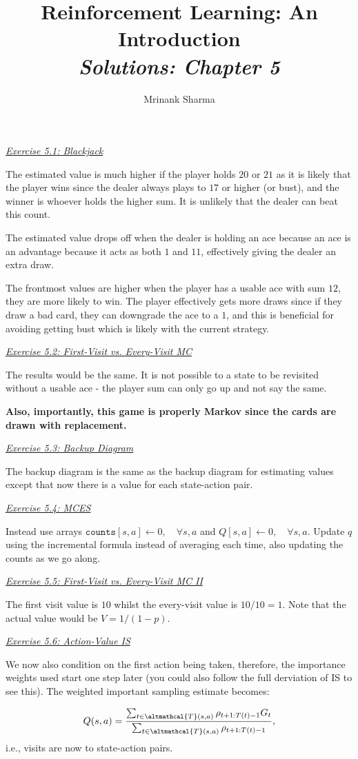 \documentclass{article}
\title{\textbf{Reinforcement Learning: An Introduction}\\
\textit{Solutions: Chapter 5}
}
\author{Mrinank Sharma}
\newcommand{\myq}[1]{%
	\vspace{1em}
	\noindent\underline{\emph{Exercise #1}}\vspace{0.25em}\linebreak
}
\begin{document}
\maketitle

\myq{5.1: Blackjack}
The estimated value is much higher if the player holds $20$ or $21$ as it is likely that the player wins since the dealer always plays to $17$ or higher (or bust), and the winner is whoever holds the higher sum. It is unlikely that the dealer can beat this count. 

The estimated value drops off when the dealer is holding an ace because an ace is an advantage because it acts as both $1$ and $11$, effectively giving the dealer an extra draw. 

The frontmost values are higher when the player has a usable ace with sum $12$, they are more likely to win. The player effectively gets more draws since if they draw a bad card, they can downgrade the ace to a $1$, and this is beneficial for avoiding getting bust which is likely with the current strategy. 

\myq{5.2: First-Visit vs. Every-Visit MC}
The results would be the same. It is not possible to a state to be revisited without a usable ace - the player sum can only go up and not say the same.

\textbf{Also, importantly, this game is properly Markov since the cards are drawn with replacement.}

\myq{5.3: Backup Diagram}
The backup diagram is the same as the backup diagram for estimating values except that now there is a value for each state-action pair. 

\myq{5.4: MCES}
Instead use arrays $\texttt{counts}[s, a] \leftarrow 0, \quad \forall s, a$ and $Q[s, a] \leftarrow 0, \quad \forall s, a$. Update $q$ using the incremental formula instead of averaging each time, also updating the counts as we go along. 

\myq{5.5: First-Visit vs. Every-Visit MC II}
The first visit value is $10$ whilst the every-visit value is $10/10 = 1$. Note that the actual value would be $V = 1/(1-p)$. 

\myq{5.6: Action-Value IS}
We now also condition on the first action being taken, therefore, the importance weights used start one step later (you could also follow the full derviation of IS to see this). The weighted important sampling estimate becomes:

\begin{align}
Q(s, a) = \frac{\sum_{t \in \altmathcal{T}(s, a)} \rho_{t+1:T(t)-1} G_t}{\sum_{t \in \altmathcal{T}(s, a)} \rho_{t+1:T(t)-1}},
\end{align}
i.e., visits are now to state-action pairs. 
\end{document}
